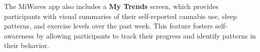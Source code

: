 The MiWaves app also includes a \textbf{My Trends} screen, 
which provides participants with visual summaries of their self-reported cannabis use, sleep patterns, and exercise levels over the past week. This feature fosters self-awareness by allowing participants to track their progress and identify patterns in their behavior. 

